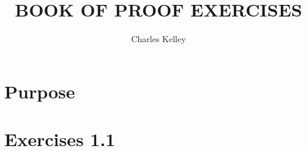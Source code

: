 \documentclass{article}
\title{BOOK OF PROOF EXERCISES}
\author{Charles Kelley}
\date{ }
\begin{document}
\maketitle

\section{Purpose}

\clearpage

\section{Exercises 1.1}

\end{document}
